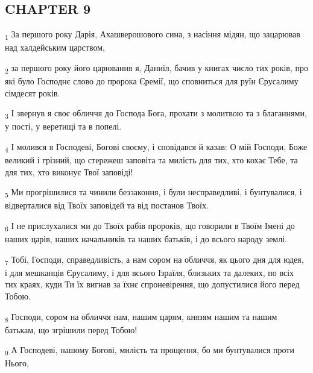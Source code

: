 \subsection{CHAPTER 9}
\begin{tcolorbox}
\textsubscript{1} За першого року Дарія, Ахашверошового сина, з насіння мідян, що зацарював над халдейським царством,
\end{tcolorbox}
\begin{tcolorbox}
\textsubscript{2} за першого року його царювання я, Даниїл, бачив у книгах число тих років, про які було Господнє слово до пророка Єремії, що сповниться для руїн Єрусалиму сімдесят років.
\end{tcolorbox}
\begin{tcolorbox}
\textsubscript{3} І звернув я своє обличчя до Господа Бога, прохати з молитвою та з благаннями, у пості, у веретищі та в попелі.
\end{tcolorbox}
\begin{tcolorbox}
\textsubscript{4} І молився я Господеві, Богові своєму, і сповідався й казав: О мій Господи, Боже великий і грізний, що стережеш заповіта та милість для тих, хто кохає Тебе, та для тих, хто виконує Твої заповіді!
\end{tcolorbox}
\begin{tcolorbox}
\textsubscript{5} Ми прогрішилися та чинили беззаконня, і були несправедливі, і бунтувалися, і відверталися від Твоїх заповідей та від постанов Твоїх.
\end{tcolorbox}
\begin{tcolorbox}
\textsubscript{6} І не прислухалися ми до Твоїх рабів пророків, що говорили в Твоїм Імені до наших царів, наших начальників та наших батьків, і до всього народу землі.
\end{tcolorbox}
\begin{tcolorbox}
\textsubscript{7} Тобі, Господи, справедливість, а нам сором на обличчя, як цього дня для юдея, і для мешканців Єрусалиму, і для всього Ізраїля, близьких та далеких, по всіх тих краях, куди Ти їх вигнав за їхнє спроневірення, що допустилися його перед Тобою.
\end{tcolorbox}
\begin{tcolorbox}
\textsubscript{8} Господи, сором на обличчя нам, нашим царям, князям нашим та нашим батькам, що згрішили перед Тобою!
\end{tcolorbox}
\begin{tcolorbox}
\textsubscript{9} А Господеві, нашому Богові, милість та прощення, бо ми бунтувалися проти Нього,
\end{tcolorbox}
